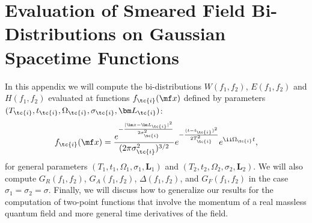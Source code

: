 





\chapter{Evaluation of Smeared Field Bi-Distributions on Gaussian Spacetime Functions}\label{app:analytical}



In this appendix we will compute the bi-distributions $W(f_1,f_2)$, $E(f_1,f_2)$ and $H(f_1,f_2)$ evaluated at functions $f_\tc{i}(\mf x)$ defined by parameters $(T_\tc{i},t_\tc{i},\Omega_\tc{i}, \sigma_\tc{i}, \bm L_\tc{i})$:
\begin{equation}
    f_\tc{i}(\mf x) = \frac{e^{-\frac{|\bm x - \bm L_\tc{i}|^2}{2 \sigma_\tc{i}^2}}}{(2\pi \sigma_\tc{i}^2)^{3/2}}e^{- \frac{(t-t_\tc{i})^2}{2T_\tc{i}^2}}e^{\ii \Omega_\tc{i} t},
\end{equation}
for general parameters  $(T_1,t_1,\Omega_1, \sigma_1, \bm L_1)$ and $(T_2,t_2,\Omega_2, \sigma_2, \bm L_2)$. We will also compute $G_R(f_1,f_2)$, $G_A(f_1,f_2)$, $\Delta(f_1,f_2)$, and $G_F(f_1,f_2)$ in the case $\sigma_1 = \sigma_2 = \sigma$. Finally, we will discuss how to generalize our results for the computation of two-point functions that involve the momentum of a real massless quantum field and more general time derivatives of the field.

